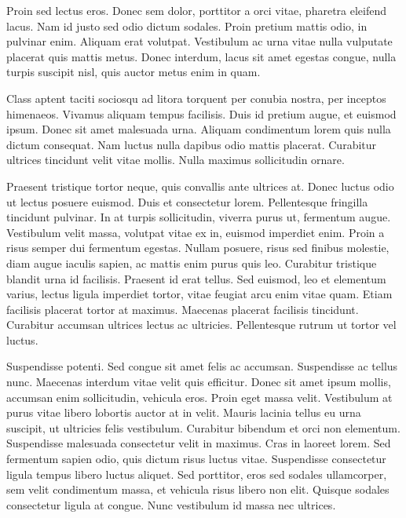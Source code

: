 \documentclass[10pt,twoside,slovak,a4paper]{article}
\begin{document}
Proin sed lectus eros. Donec sem dolor, porttitor a orci vitae, pharetra eleifend lacus. Nam id justo sed odio dictum sodales. Proin pretium mattis odio, in pulvinar enim. Aliquam erat volutpat. Vestibulum ac urna vitae nulla vulputate placerat quis mattis metus. Donec interdum, lacus sit amet egestas congue, nulla turpis suscipit nisl, quis auctor metus enim in quam.

Class aptent taciti sociosqu ad litora torquent per conubia nostra, per inceptos himenaeos. Vivamus aliquam tempus facilisis. Duis id pretium augue, et euismod ipsum. Donec sit amet malesuada urna. Aliquam condimentum lorem quis nulla dictum consequat. Nam luctus nulla dapibus odio mattis placerat. Curabitur ultrices tincidunt velit vitae mollis. Nulla maximus sollicitudin ornare.

Praesent tristique tortor neque, quis convallis ante ultrices at. Donec luctus odio ut lectus posuere euismod. Duis et consectetur lorem. Pellentesque fringilla tincidunt pulvinar. In at turpis sollicitudin, viverra purus ut, fermentum augue. Vestibulum velit massa, volutpat vitae ex in, euismod imperdiet enim. Proin a risus semper dui fermentum egestas. Nullam posuere, risus sed finibus molestie, diam augue iaculis sapien, ac mattis enim purus quis leo. Curabitur tristique blandit urna id facilisis. Praesent id erat tellus. Sed euismod, leo et elementum varius, lectus ligula imperdiet tortor, vitae feugiat arcu enim vitae quam. Etiam facilisis placerat tortor at maximus. Maecenas placerat facilisis tincidunt. Curabitur accumsan ultrices lectus ac ultricies. Pellentesque rutrum ut tortor vel luctus.

Suspendisse potenti. Sed congue sit amet felis ac accumsan. Suspendisse ac tellus nunc. Maecenas interdum vitae velit quis efficitur. Donec sit amet ipsum mollis, accumsan enim sollicitudin, vehicula eros. Proin eget massa velit. Vestibulum at purus vitae libero lobortis auctor at in velit. Mauris lacinia tellus eu urna suscipit, ut ultricies felis vestibulum. Curabitur bibendum et orci non elementum. Suspendisse malesuada consectetur velit in maximus. Cras in laoreet lorem. Sed fermentum sapien odio, quis dictum risus luctus vitae. Suspendisse consectetur ligula tempus libero luctus aliquet. Sed porttitor, eros sed sodales ullamcorper, sem velit condimentum massa, et vehicula risus libero non elit. Quisque sodales consectetur ligula at congue. Nunc vestibulum id massa nec ultrices.



\newpage

\end{document}
